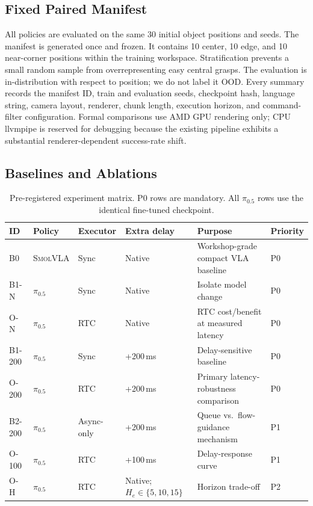 \documentclass[10pt,twocolumn]{article}
\newcommand{\pifive}{$\pi_{0.5}$}
\newcommand{\smolvla}{\textsc{SmolVLA}}
\begin{document}
\subsection{Fixed Paired Manifest}

All policies are evaluated on the same 30 initial object positions and seeds.
The manifest is generated once and frozen.  It contains 10 center, 10 edge,
and 10 near-corner positions within the training workspace.  Stratification
prevents a small random sample from overrepresenting easy central grasps.  The
evaluation is in-distribution with respect to position; we do not label it
OOD.  Every summary records the manifest ID, train and evaluation seeds,
checkpoint hash, language string, camera layout, renderer, chunk length,
execution horizon, and command-filter configuration.  Formal comparisons use
AMD GPU rendering only; CPU llvmpipe is reserved for debugging because the
existing pipeline exhibits a substantial renderer-dependent success-rate
shift.

\subsection{Baselines and Ablations}

\begin{table}[t]
\centering
\caption{Pre-registered experiment matrix. P0 rows are mandatory. All \pifive
rows use the identical fine-tuned checkpoint.}
\label{tab:matrix}
\small
\begin{tabular}{llllll}
\toprule
ID & Policy & Executor & Extra delay & Purpose & Priority \\
\midrule
B0 & \smolvla & Sync & Native & Workshop-grade compact VLA baseline & P0 \\
B1-N & \pifive & Sync & Native & Isolate model change & P0 \\
O-N & \pifive & RTC & Native & RTC cost/benefit at measured latency & P0 \\
B1-200 & \pifive & Sync & +200\,ms & Delay-sensitive baseline & P0 \\
O-200 & \pifive & RTC & +200\,ms & Primary latency-robustness comparison & P0 \\
B2-200 & \pifive & Async-only & +200\,ms & Queue vs.\ flow-guidance mechanism & P1 \\
O-100 & \pifive & RTC & +100\,ms & Delay-response curve & P1 \\
O-H & \pifive & RTC & Native; $H_e\in\{5,10,15\}$ & Horizon trade-off & P2 \\
\bottomrule
\end{tabular}
\end{table}
\end{document}
